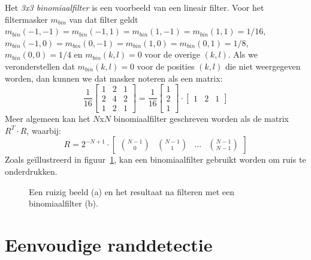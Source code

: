 Het \emph{3x3 binomiaalfilter} is een voorbeeld van een lineair filter. Voor het filtermasker 
$m_{bin}$ van dat filter geldt $m_{bin}(-1,-1)=m_{bin}(-1,1)=m_{bin}(1,-1)=m_{bin}(1,1)=1/16$, 
$m_{bin}(-1,0)=m_{bin}(0,-1)=m_{bin}(1,0)=m_{bin}(0,1)=1/8$, $m_{bin}(0,0)=1/4$ en 
$m_{bin}(k,l)=0$ voor de overige $(k,l)$. Als we veronderstellen dat $m_{bin}(k,l)=0$ voor de 
posities $(k,l)$ die niet weergegeven worden, dan kunnen we dat masker noteren als een matrix:
\begin{displaymath}
\frac{1}{16}\left[ \begin{array}{ccc} 1 & 2 & 1\\ 2 & 4 & 2\\ 1 & 2 & 1 \end{array} \right]
= \frac{1}{16}\left[ \begin{array}{c} 1\\ 2\\ 1 \end{array} \right] \cdot 
\left[ \begin{array}{ccc} 1 & 2 & 1 \end{array} \right]
\end{displaymath}
Meer algemeen kan het $N$x$N$ binomiaalfilter geschreven worden als de matrix $R^T \cdot R$,
waarbij: 
\begin{displaymath}
R=2^{-N+1} \cdot \left[ \begin{array}{cccc} \binom{N-1}{0} & \binom{N-1}{1} & 
\ldots & \binom{N-1}{N-1} \end{array} \right]
\end{displaymath}
Zoals ge\"illustreerd in figuur~\ref{fig:indische_ruizig_en_binom}, kan een binomiaalfilter 
gebruikt worden om ruis te onderdrukken.

\begin{figure}[bp]
\vspace{10pt}
\centering
{}
\hspace{1cm}
\caption{\label{fig:indische_ruizig_en_binom}Een ruizig beeld (a) en het resultaat na 
filteren met een binomiaalfilter (b).}
\end{figure}

\section{Eenvoudige randdetectie}
\label{sectie:randdetectie}

